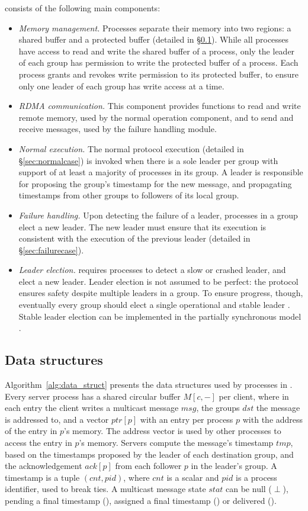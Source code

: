 \libname consists of the following main components:
\begin{itemize}
  \item \emph{Memory management.} Processes separate their memory into two regions: a shared buffer and a protected buffer (detailed in \S\ref{sec:ds-structs}). While all processes have access to read and write the shared buffer of a process, only the leader of each group has permission to write the protected buffer of a process. Each process grants and revokes write permission to its protected buffer, to ensure only one leader of each group has write access at a time.
  \item \emph{RDMA communication.} This component provides functions to read and write remote memory, used by the normal operation component, and to send and receive messages, used by the failure handling module.
  \item \emph{Normal execution.} The normal protocol execution (detailed in \S\ref{sec:normalcase}) is invoked when there is a sole leader per group with support of at least a majority of processes in its group. A leader is responsible for proposing the group's timestamp for the new message, and propagating timestamps from other groups to followers of its local group.
  \item \emph{Failure handling.} Upon detecting the failure of a leader, processes in a group elect a new leader. The new leader must ensure that its execution is consistent with the execution of the previous leader (detailed in \S\ref{sec:failurecase}).
  \item \emph{Leader election.} \libname requires processes to detect a slow or crashed leader, and elect a new leader. Leader election is not assumed to be perfect: the protocol ensures safety despite multiple leaders in a group. To ensure progress, though, eventually every group should elect a single operational and stable leader \cite{Aguilera2019,L98}.
Stable leader election can be implemented in the partially synchronous model \cite{Aguilera2001}.
\end{itemize}

\subsection{Data structures}
\label{sec:ds-structs}

Algorithm~\ref{alg:data_struct} presents the data structures used by processes in \libname.
Every server process has a shared circular buffer $M[c,-]$ per client, where in each entry the client writes a multicast message $msg$, the groups $dst$ the message is addressed to, and a vector $ptr[p]$ with an entry per process $p$ with the address of the entry in $p$'s memory. The address vector is used by other processes to access the entry in $p$'s memory.
Servers compute the message's timestamp $tmp$, based on the timestamps proposed by the leader of each destination group, and the acknowledgement $ack[p]$ from each follower $p$ in the leader's group.
A timestamp is a tuple $(cnt,pid)$, where $cnt$ is a scalar and $pid$ is a process identifier, used to break ties.
A multicast message state $stat$ can be null ($\perp$), pending a final timestamp (\mcast), assigned a final timestamp (\ordered) or delivered (\done).

